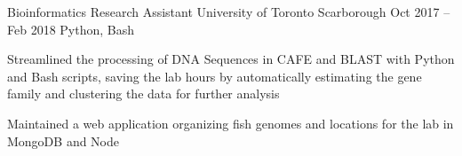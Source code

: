 \begin{cventries}
  \cventry
    {Bioinformatics Research Assistant}
    {University of Toronto}
    {Scarborough}
    {Oct 2017 -- Feb 2018}
    {Python, Bash}
    {
      \begin{cvitems}
        \item {Streamlined the processing of DNA Sequences in CAFE and BLAST with Python and Bash scripts, saving the lab hours by automatically estimating the gene family and clustering the data for further analysis}
        \item {Maintained a web application organizing fish genomes and locations for the lab in MongoDB and Node}
      \end{cvitems}
    }
\end{cventries}
